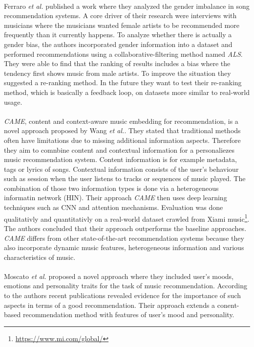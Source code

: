 \documentclass[runningheads,a4paper]{llncs}
\begin{document}
\\
Ferraro \textit{et al.} published a work where they analyzed the gender imbalance in song recommendation systems. A core driver of 
their research were interviews with musicians where the musicians wanted female artists to be recommended more frequently than it currently happens.
To analyze whether there is actually a gender bias, the authors incorporated gender information into a dataset and
performed recommendations using a collaborative-filtering method named \textit{ALS}.
They were able to find that the ranking of results includes a bias where the tendency first shows music from male artists. 
To improve the situation they suggested a re-ranking method. In the future they want to test their re-ranking method, which is basically a feedback loop, on datasets more similar to real-world usage. \cite{ferraro2021break}\\
\\
\textit{CAME}, content and context-aware music embedding for recommendation, is a novel approach proposed by Wang \textit{et al.}.
They stated that traditional methods often have limitations due to missing additional information aspects. 
Therefore they aim to comnbine content and contextual information for a personaliezes music recommendation system. 
Content information is for example metadata, tags or lyrics of songs. 
Contextual information consists of the user's behaviour such as session when the user listens to tracks or sequences of music played. 
The combination of those two information types is done via a heterogeneous informatin network (HIN).
Their approach \textit{CAME} then uses deep learning techniques such as CNN and attention mechanisms.
Evaluation was done qualitativly and quantitativly on a real-world dataset crawled from Xiami music\footnote{\url{https://www.mi.com/global/}}. 
The authors concluded that their approach outperforms the baseline approaches.
\textit{CAME} differs from other state-of-the-art recommendation systems because they 
also incorporate dynamic music features, heterogeneous information and various characteristics of music.
\cite{wang2020came}\\
\\
Moscato \textit{et al.} proposed a novel approach where they included user's moods, emotions and personality traits for the 
task of music recommendation. According to the authors recent publications revealed evidence for the importance of such aspects in terms of 
a good recommendation.
Their approach extends a conent-based recommendation method with features of user's mood and personality.\\
\end{document}
